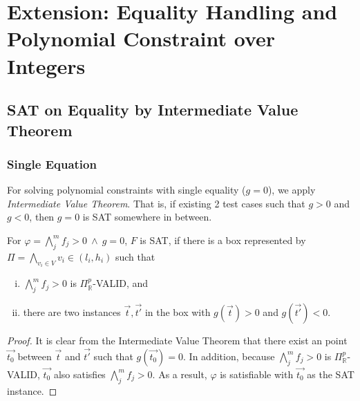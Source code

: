 \chapter{Extension: Equality Handling and Polynomial Constraint over Integers}

\section{SAT on Equality by Intermediate Value Theorem} \label{sec:eq}
\subsection*{Single Equation}
For solving polynomial constraints with single equality ($g=0$), we apply {\em Intermediate Value Theorem}. 
That is, if existing 2 test cases such that $g > 0$ and $g < 0$, then $g=0$ is SAT somewhere in between. 

\begin{lemma} \label{lemma:ivt}
For $\varphi = \bigwedge \limits_{j}^m f_j > 0~\wedge~g = 0$, $F$ is SAT, if 
there is a box represented by $\Pi = \bigwedge\limits_{v_i \in V}v_i \in (l_i, h_i)$ such that
\begin{enumerate}[(i)]
\item $\bigwedge \limits_{j}^m f_j > 0$ is $\Pi^p_\mathbb{R}$-VALID, and 
\item there are two instances $\vec{t},\vec{t'}$ in the box with $g(\vec{t}) > 0$ and $g(\vec{t'}) < 0$.
\end{enumerate}
\end{lemma}

\begin{proof}
It is clear from the Intermediate Value Theorem that there exist an point $\vec{t_0}$ between $\vec{t}$ and $\vec{t'}$ such that $g(\vec{t_0}) = 0$. In addition, because $\bigwedge \limits_{j}^m f_j > 0$ is $\Pi^p_\mathbb{R}$-VALID, $\vec{t_0}$ also satisfies $\bigwedge \limits_{j}^m f_j > 0$. As a result, $\varphi$ is satisfiable with $\vec{t_0}$ as the SAT instance.
\end{proof}

